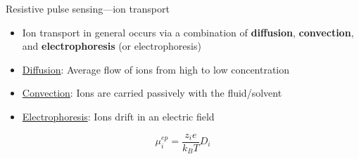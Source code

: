 \begin{frame}[c]{Resistive pulse sensing---ion transport}	
	\begin{itemize}
		\item Ion transport in general occurs via a combination of \textbf{diffusion}, \textbf{convection}, and \textbf{electrophoresis} (or electrophoresis)
		\item \underline{Diffusion}: Average flow of ions from high to low concentration
		\item \underline{Convection}: Ions are carried passively with the fluid/solvent
		\item \underline{Electrophoresis}: Ions drift in an electric field
	\end{itemize}
	\begin{equation} \tag{Einstein-Smoluchowski relation} 
		\mu^{ep}_{i}=\frac{z_{i}e}{k_{B}T}D_{i}
	\end{equation}

	


\end{frame}



